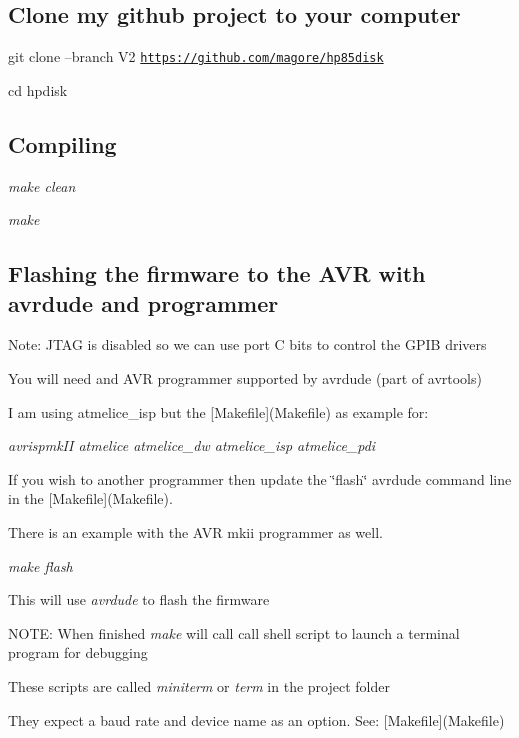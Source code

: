\subsection*{Clone my github project to your computer}


\begin{DoxyItemize}
\item git clone --branch V2 \href{https://github.com/magore/hp85disk}{\tt https\+://github.\+com/magore/hp85disk}
\item cd hpdisk
\end{DoxyItemize}

\subsection*{Compiling}


\begin{DoxyItemize}
\item {\itshape make clean}
\item {\itshape make}
\end{DoxyItemize}

\subsection*{Flashing the firmware to the A\+VR with avrdude and programmer}


\begin{DoxyItemize}
\item Note\+: J\+T\+AG is disabled so we can use port C bits to control the G\+P\+IB drivers
\item You will need and A\+VR programmer supported by avrdude (part of avrtools)
\begin{DoxyItemize}
\item I am using atmelice\+\_\+isp but the \mbox{[}Makefile\mbox{]}(Makefile) as example for\+:
\item {\itshape avrispmk\+II atmelice atmelice\+\_\+dw atmelice\+\_\+isp atmelice\+\_\+pdi}
\item If you wish to another programmer then update the \char`\"{}flash\char`\"{} avrdude command line in the \mbox{[}Makefile\mbox{]}(Makefile).
\item There is an example with the A\+VR mkii programmer as well.
\end{DoxyItemize}
\item {\itshape make flash}
\begin{DoxyItemize}
\item This will use {\itshape avrdude} to flash the firmware
\item N\+O\+TE\+: When finished {\itshape make} will call call shell script to launch a terminal program for debugging
\begin{DoxyItemize}
\item These scripts are called {\itshape miniterm} or {\itshape term} in the project folder
\item They expect a baud rate and device name as an option. See\+: \mbox{[}Makefile\mbox{]}(Makefile)
\end{DoxyItemize}
\end{DoxyItemize}
\end{DoxyItemize}


